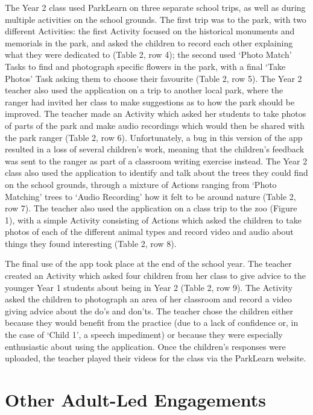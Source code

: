 The Year 2 class used ParkLearn on three separate school trips, as well as
during multiple activities on the school grounds. The first trip was to the
park, with two different Activities: the first Activity focused on the
historical monuments and memorials in the park, and asked the children to record
each other explaining what they were dedicated to (Table 2, row 4); the second
used ‘Photo Match’ Tasks to find and photograph specific flowers in the park,
with a final ‘Take Photos’ Task asking them to choose their favourite (Table 2,
row 5). The Year 2 teacher also used the application on a trip to another local
park, where the ranger had invited her class to make suggestions as to how the
park should be improved. The teacher made an Activity which asked her students
to take photos of parts of the park and make audio recordings which would then
be shared with the park ranger (Table 2, row 6). Unfortunately, a bug in this
version of the app resulted in a loss of several children’s work, meaning that
the children’s feedback was sent to the ranger as part of a classroom writing
exercise instead. The Year 2 class also used the application to identify and
talk about the trees they could find on the school grounds, through a mixture of
Actions ranging from ‘Photo Matching’ trees to ‘Audio Recording’ how it felt to
be around nature (Table 2, row 7). The teacher also used the application on a
class trip to the zoo (Figure 1), with a simple Activity consisting of Actions
which asked the children to take photos of each of the different animal types
and record video and audio about things they found interesting (Table 2, row 8).

The final use of the app took place at the end of the school year. The teacher
created an Activity which asked four children from her class to give advice to
the younger Year 1 students about being in Year 2 (Table 2, row 9). The Activity
asked the children to photograph an area of her classroom and record a video
giving advice about the do’s and don’ts. The teacher chose the children either
because they would benefit from the practice (due to a lack of confidence or, in
the case of ‘Child 1’, a speech impediment) or because they were especially
enthusiastic about using the application. Once the children’s responses were
uploaded, the teacher played their videos for the class via the ParkLearn
website.

\section{Other Adult-Led Engagements}

